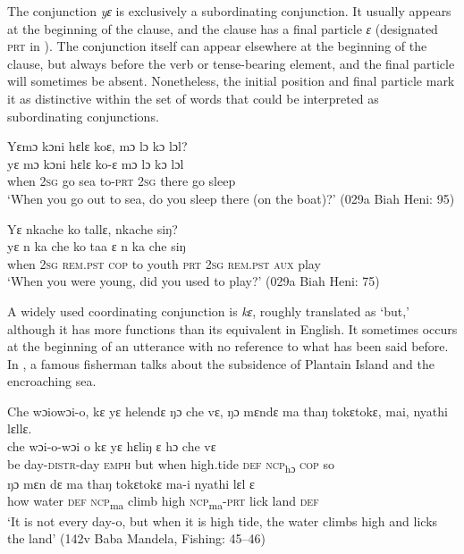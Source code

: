 The conjunction \textit{yɛ} is exclusively a subordinating conjunction. It usually appears at the beginning of the clause, and the clause has a final particle \textit{ɛ} (designated \textsc{prt} in ). The conjunction itself can appear elsewhere at the beginning of the clause, but always before the verb or tense-bearing element, and the final particle will sometimes be absent. Nonetheless, the initial position and final particle mark it as distinctive within the set of words that could be interpreted as subordinating conjunctions.

\ea%
    \label{ex:103}
  \ea Yɛmɔ kɔni hɛlɛ koɛ, mɔ lɔ kɔ lɔl?\\
  \gll yɛ      mɔ  kɔni  hɛlɛ  ko-ɛ    mɔ  lɔ    kɔ    lɔl\\
  when    \textsc{2sg}  go    sea  to-\textsc{prt}  \textsc{2sg}  there  go    sleep\\
  \glt ‘When you go out to sea, do you sleep there (on the boat)?' (029a Biah Heni: 95)

\ex Yɛ  nkache ko tallɛ, nkache siŋ?\\
    \gll yɛ      n    ka      che  ko    taa      ɛ    n    ka      che  siŋ\\
    when    \textsc{2sg}  \textsc{rem.pst}  \textsc{cop}  to    youth    \textsc{prt}  \textsc{2sg}  \textsc{rem.pst}  \textsc{aux}  play\\
    \glt ‘When you were young, did you used to play?' (029a Biah Heni: 75)
\z
\z

A widely used coordinating conjunction is \textit{kɛ}, roughly translated as ‘but,' although it has more functions than its equivalent in English. It sometimes occurs at the beginning of an utterance with no reference to what has been said before. In , a famous fisherman talks about the subsidence of Plantain Island and the encroaching sea.

\ea%
    \label{ex:104}
    Che wɔiowɔi-o, kɛ yɛ helendɛ ŋɔ che vɛ, ŋɔ mɛndɛ ma thaŋ tokɛtokɛ, mai, nyathi lɛllɛ.\\
    \gll che  wɔi-o-wɔi    o      kɛ    yɛ      hɛliŋ      ɛ    hɔ      che  vɛ\\
    be    day-\textsc{distr}{}-day  \textsc{emph}    but  when    high.tide    \textsc{def}  \textsc{ncp}\textsubscript{hɔ}    \textsc{cop}  so\\
    \gll ŋɔ    mɛn    dɛ    ma    thaŋ    tokɛtokɛ    ma-i      nyathi  lɛl    ɛ\\
    how  water    \textsc{def}  \textsc{ncp}\textsubscript{ma}    climb    high      \textsc{ncp}\textsubscript{ma}{}-\textsc{prt}  lick    land  \textsc{def}\\
  \glt ‘It is not every day-o, but when it is high tide, the water climbs high and licks the land' (142v Baba Mandela, Fishing: 45–46)
\z

